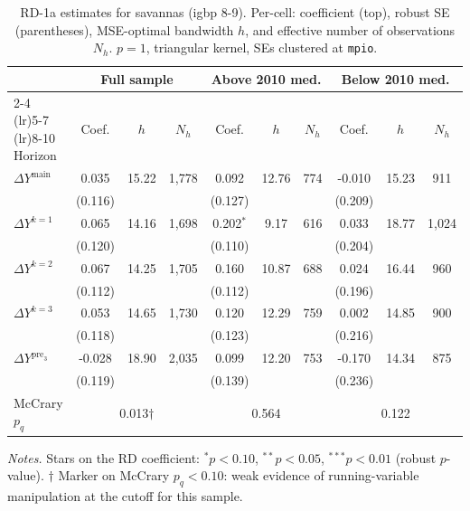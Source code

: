 \documentclass[11pt]{article}
\begin{document}
\begin{table}[H]
\centering
\scriptsize
\caption{RD-1a estimates for savannas (igbp 8-9). Per-cell: coefficient
(top), robust SE (parentheses), MSE-optimal bandwidth $h$, and
effective number of observations $N_h$. $p=1$, triangular kernel,
SEs clustered at \texttt{mpio}.}
\label{tab:rdplot_rd1a_savannas}
\begin{tabular}{l ccc ccc ccc}
\toprule
 & \multicolumn{3}{c}{Full sample} & \multicolumn{3}{c}{Above 2010 med.} & \multicolumn{3}{c}{Below 2010 med.} \\
\cmidrule(lr){2-4} \cmidrule(lr){5-7} \cmidrule(lr){8-10}
Horizon & Coef. & $h$ & $N_h$ & Coef. & $h$ & $N_h$ & Coef. & $h$ & $N_h$ \\
\midrule
$\Delta Y^{\text{main}}$ & 0.035 & 15.22 & 1,778 & 0.092 & 12.76 & 774 & -0.010 & 15.23 & 911 \\
 & (0.116) &  &  & (0.127) &  &  & (0.209) &  &  \\
\addlinespace[1pt]
$\Delta Y^{k=1}$ & 0.065 & 14.16 & 1,698 & 0.202$^{*}$ & 9.17 & 616 & 0.033 & 18.77 & 1,024 \\
 & (0.120) &  &  & (0.110) &  &  & (0.204) &  &  \\
\addlinespace[1pt]
$\Delta Y^{k=2}$ & 0.067 & 14.25 & 1,705 & 0.160 & 10.87 & 688 & 0.024 & 16.44 & 960 \\
 & (0.112) &  &  & (0.112) &  &  & (0.196) &  &  \\
\addlinespace[1pt]
$\Delta Y^{k=3}$ & 0.053 & 14.65 & 1,730 & 0.120 & 12.29 & 759 & 0.002 & 14.85 & 900 \\
 & (0.118) &  &  & (0.123) &  &  & (0.216) &  &  \\
\addlinespace[1pt]
$\Delta Y^{\text{pre}_3}$ & -0.028 & 18.90 & 2,035 & 0.099 & 12.20 & 753 & -0.170 & 14.34 & 875 \\
 & (0.119) &  &  & (0.139) &  &  & (0.236) &  &  \\
\addlinespace[1pt]
\midrule
McCrary $p_q$ & \multicolumn{3}{c}{0.013$\dagger$} & \multicolumn{3}{c}{0.564} & \multicolumn{3}{c}{0.122} \\
\bottomrule
\end{tabular}
\begin{flushleft}\footnotesize
\textit{Notes.} Stars on the RD coefficient: $^{*}p<0.10$,
$^{**}p<0.05$, $^{***}p<0.01$ (robust $p$-value).
$\dagger$ Marker on McCrary $p_q<0.10$: weak evidence of running-variable manipulation at the cutoff for this sample.\\
\end{flushleft}
\end{table}
\end{document}
